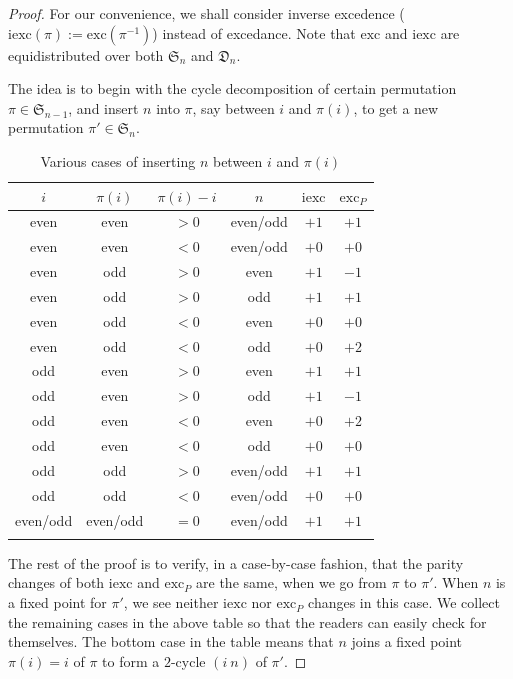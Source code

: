 \documentclass[11pt,reqno]{amsart}
\numberwithin{equation}{section}
\theoremstyle{plain}
\theoremstyle{definition}
\renewcommand{\S}{\mathfrak{S}}
\def\exc{\mathrm{exc}}
\def\iexc{\mathrm{iexc}}
\newcommand{\D}{\mathfrak{D}}
\begin{document}
\begin{proof}
For our convenience, we shall consider inverse excedence ($\iexc(\pi):=\exc(\pi^{-1})$) instead of excedance. Note that $\exc$ and $\iexc$ are equidistributed over both $\S_n$ and $\D_n$.

The idea is to begin with the cycle decomposition of certain permutation $\pi\in\S_{n-1}$, and insert $n$ into $\pi$, say between $i$ and $\pi(i)$, to get a new permutation $\pi'\in\S_n$.

\begin{table}[htb]
{
\begin{tabular*}{3.8in}{cccccc}
\toprule
$i$ & $\pi(i)$ & $\pi(i)-i$ & $n$ & $\iexc$ & $\exc_P$\\
\midrule
even & even & $>0$ & even/odd & $+1$ & $+1$\\
even & even & $<0$ & even/odd & $+0$ & $+0$\\
even & odd & $>0$ & even & $+1$ & $-1$\\
even & odd & $>0$ & odd & $+1$ & $+1$\\
even & odd & $<0$ & even & $+0$ & $+0$\\
even & odd & $<0$ & odd & $+0$ & $+2$\\
odd & even & $>0$ & even & $+1$ & $+1$\\
odd & even & $>0$ & odd & $+1$ & $-1$\\
odd & even & $<0$ & even & $+0$ & $+2$\\
odd & even & $<0$ & odd & $+0$ & $+0$\\
odd & odd & $>0$ & even/odd & $+1$ & $+1$\\
odd & odd & $<0$ & even/odd & $+0$ & $+0$\\
even/odd & even/odd & $=0$ & even/odd & $+1$ & $+1$\\
\bottomrule\\
\end{tabular*}
}
\caption{Various cases of inserting $n$ between $i$ and $\pi(i)$}
\end{table}

The rest of the proof is to verify, in a case-by-case fashion, that the parity changes of both $\iexc$ and $\exc_P$ are the same, when we go from $\pi$ to $\pi'$. When $n$ is a fixed point for $\pi'$, we see neither $\iexc$ nor $\exc_P$ changes in this case. We collect the remaining cases in the above table so that the readers can easily check for themselves. The bottom case in the table means that $n$ joins a fixed point $\pi(i)=i$ of $\pi$ to form a $2$-cycle $(i~n)$ of $\pi'$.
\end{proof}
\end{document}
